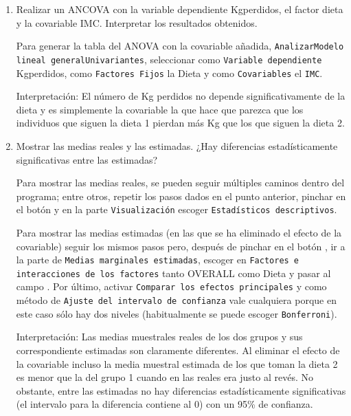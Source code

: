 \begin{enumerate}
\begin{enumerate}
\begin{indicacion}
{}
\end{indicacion}

\item Realizar un ANCOVA con la variable dependiente Kgperdidos, el factor dieta y la covariable IMC. Interpretar los resultados obtenidos.

\begin{indicacion}{Para generar la tabla del ANOVA con la covariable añadida, \texttt{Analizar\flecha Modelo lineal general\flecha Univariantes}, seleccionar como \texttt{Variable dependiente} \textsf{Kgperdidos}, como \texttt{Factores Fijos} la \textsf{Dieta} y como \texttt{Covariables} el \texttt{IMC}.

Interpretación: El número de Kg perdidos no depende significativamente de la dieta y es simplemente la covariable la que hace que parezca que los individuos que siguen la dieta 1 pierdan más Kg que los que siguen la dieta 2.

}
\end{indicacion}

\item Mostrar las medias reales y las estimadas. ¿Hay diferencias estadísticamente significativas entre las estimadas?

\begin{indicacion}{

Para mostrar las medias reales, se pueden seguir múltiples caminos dentro del programa; entre otros, repetir los pasos dados en el punto anterior, pinchar en el botón  y en la parte \texttt{Visualización} escoger \texttt{Estadísticos descriptivos}.

Para mostrar las medias estimadas (en las que se ha eliminado el efecto de la covariable) seguir los mismos pasos pero, después de pinchar en el botón , ir a la parte de \texttt{Medias marginales estimadas}, escoger en \texttt{Factores e interacciones de los factores} tanto \textsf{OVERALL} como \textsf{Dieta} y pasar al campo . Por último, activar \texttt{Comparar los efectos principales} y como método de \texttt{Ajuste del intervalo de confianza} vale cualquiera porque en este caso sólo hay dos niveles (habitualmente se puede escoger \texttt{Bonferroni}).

Interpretación: Las medias muestrales reales de los dos grupos y sus correspondiente estimadas son claramente diferentes. Al eliminar el efecto de la covariable incluso la media muestral estimada de los que toman la dieta 2 es menor que la del grupo 1 cuando en las reales era justo al revés. No obstante, entre las estimadas no hay diferencias estadísticamente significativas (el intervalo para la diferencia contiene al 0) con un 95\% de confianza.

}
\end{indicacion}
\end{enumerate}
\end{enumerate}
